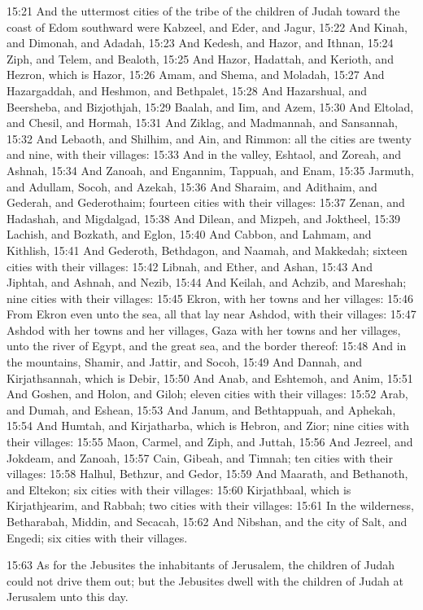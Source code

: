 15:21 And the uttermost cities of the tribe of the children of Judah
toward the coast of Edom southward were Kabzeel, and Eder, and Jagur,
15:22 And Kinah, and Dimonah, and Adadah, 15:23 And Kedesh, and Hazor,
and Ithnan, 15:24 Ziph, and Telem, and Bealoth, 15:25 And Hazor,
Hadattah, and Kerioth, and Hezron, which is Hazor, 15:26 Amam, and
Shema, and Moladah, 15:27 And Hazargaddah, and Heshmon, and Bethpalet,
15:28 And Hazarshual, and Beersheba, and Bizjothjah, 15:29 Baalah, and
Iim, and Azem, 15:30 And Eltolad, and Chesil, and Hormah, 15:31 And
Ziklag, and Madmannah, and Sansannah, 15:32 And Lebaoth, and Shilhim,
and Ain, and Rimmon: all the cities are twenty and nine, with their
villages: 15:33 And in the valley, Eshtaol, and Zoreah, and Ashnah,
15:34 And Zanoah, and Engannim, Tappuah, and Enam, 15:35 Jarmuth, and
Adullam, Socoh, and Azekah, 15:36 And Sharaim, and Adithaim, and
Gederah, and Gederothaim; fourteen cities with their villages: 15:37
Zenan, and Hadashah, and Migdalgad, 15:38 And Dilean, and Mizpeh, and
Joktheel, 15:39 Lachish, and Bozkath, and Eglon, 15:40 And Cabbon, and
Lahmam, and Kithlish, 15:41 And Gederoth, Bethdagon, and Naamah, and
Makkedah; sixteen cities with their villages: 15:42 Libnah, and Ether,
and Ashan, 15:43 And Jiphtah, and Ashnah, and Nezib, 15:44 And Keilah,
and Achzib, and Mareshah; nine cities with their villages: 15:45
Ekron, with her towns and her villages: 15:46 From Ekron even unto the
sea, all that lay near Ashdod, with their villages: 15:47 Ashdod with
her towns and her villages, Gaza with her towns and her villages, unto
the river of Egypt, and the great sea, and the border thereof: 15:48
And in the mountains, Shamir, and Jattir, and Socoh, 15:49 And Dannah,
and Kirjathsannah, which is Debir, 15:50 And Anab, and Eshtemoh, and
Anim, 15:51 And Goshen, and Holon, and Giloh; eleven cities with their
villages: 15:52 Arab, and Dumah, and Eshean, 15:53 And Janum, and
Bethtappuah, and Aphekah, 15:54 And Humtah, and Kirjatharba, which is
Hebron, and Zior; nine cities with their villages: 15:55 Maon, Carmel,
and Ziph, and Juttah, 15:56 And Jezreel, and Jokdeam, and Zanoah,
15:57 Cain, Gibeah, and Timnah; ten cities with their villages: 15:58
Halhul, Bethzur, and Gedor, 15:59 And Maarath, and Bethanoth, and
Eltekon; six cities with their villages: 15:60 Kirjathbaal, which is
Kirjathjearim, and Rabbah; two cities with their villages: 15:61 In
the wilderness, Betharabah, Middin, and Secacah, 15:62 And Nibshan,
and the city of Salt, and Engedi; six cities with their villages.

15:63 As for the Jebusites the inhabitants of Jerusalem, the children
of Judah could not drive them out; but the Jebusites dwell with the
children of Judah at Jerusalem unto this day.

